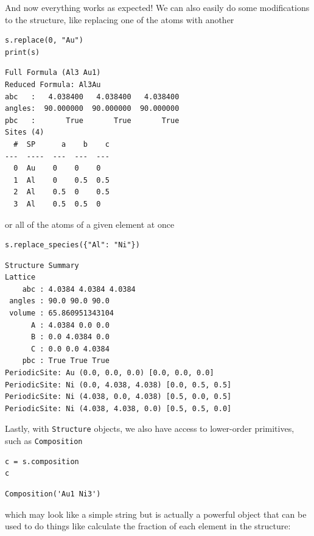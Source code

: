 And now everything works as expected! We can also easily do some
modifications to the structure, like replacing one of the atoms with
another

\begin{verbatim}
s.replace(0, "Au")
print(s)
\end{verbatim}

\begin{verbatim}
Full Formula (Al3 Au1)
Reduced Formula: Al3Au
abc   :   4.038400   4.038400   4.038400
angles:  90.000000  90.000000  90.000000
pbc   :       True       True       True
Sites (4)
  #  SP      a    b    c
---  ----  ---  ---  ---
  0  Au    0    0    0
  1  Al    0    0.5  0.5
  2  Al    0.5  0    0.5
  3  Al    0.5  0.5  0
\end{verbatim}

or all of the atoms of a given element at once

\begin{verbatim}
s.replace_species({"Al": "Ni"})
\end{verbatim}

\begin{verbatim}
Structure Summary
Lattice
    abc : 4.0384 4.0384 4.0384
 angles : 90.0 90.0 90.0
 volume : 65.860951343104
      A : 4.0384 0.0 0.0
      B : 0.0 4.0384 0.0
      C : 0.0 0.0 4.0384
    pbc : True True True
PeriodicSite: Au (0.0, 0.0, 0.0) [0.0, 0.0, 0.0]
PeriodicSite: Ni (0.0, 4.038, 4.038) [0.0, 0.5, 0.5]
PeriodicSite: Ni (4.038, 0.0, 4.038) [0.5, 0.0, 0.5]
PeriodicSite: Ni (4.038, 4.038, 0.0) [0.5, 0.5, 0.0]
\end{verbatim}

Lastly, with \texttt{Structure} objects, we also have
access to lower-order primitives, such as
\texttt{Composition}

\begin{verbatim}
c = s.composition
c
\end{verbatim}

\begin{verbatim}
Composition('Au1 Ni3')
\end{verbatim}

which may look like a simple string but is actually a powerful object
that can be used to do things like calculate the fraction of each
element in the structure:

